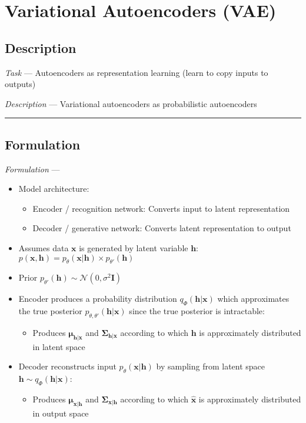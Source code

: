 \section{Variational Autoencoders (VAE)}
\subsection*{Description}
\emph{Task} --- Autoencoders as representation learning (learn to copy inputs to outputs)

\emph{Description} --- Variational autoencoders as probabilistic autoencoders

{\color{black}\hrule height 0.001mm}

\subsection*{Formulation}
\emph{Formulation} --- 
\begin{itemize}
    \item Model architecture: 
    \begin{itemize}
        \item Encoder / recognition network: Converts input to latent representation
        \item Decoder / generative network: Converts latent representation to output
    \end{itemize}
    \item Assumes data $\boldsymbol{x}$ is generated by latent variable $\boldsymbol{h}$: $p(\boldsymbol{x}, \boldsymbol{h}) = p_\theta(\boldsymbol{x} | \boldsymbol{h}) \times p_{\theta'}(\boldsymbol{h})$
    \item Prior $p_{\theta'}(\boldsymbol{h}) \sim \mathcal{N}(0,\sigma^2 \boldsymbol{I})$
    \item Encoder produces a probability distribution $q_\Phi(\boldsymbol{h}|\boldsymbol{x})$ which approximates the true posterior $p_{\theta, \theta'}(\boldsymbol{h}|\boldsymbol{x})$ since the true posterior is intractable:
    \begin{itemize}
        \item Produces $\boldsymbol{\mu}_{\boldsymbol{h|x}}$ and $\boldsymbol{\Sigma}_{\boldsymbol{h|x}}$ according to which $\boldsymbol{h}$ is approximately distributed in latent space
    \end{itemize}
    \item Decoder reconstructs input $p_\theta(\boldsymbol{x} | \boldsymbol{h})$ by sampling from latent space $\boldsymbol{h} \sim q_\Phi(\boldsymbol{h}|\boldsymbol{x})$:
    \begin{itemize}
        \item Produces $\boldsymbol{\mu}_{\boldsymbol{x|h}}$ and $\boldsymbol{\Sigma}_{\boldsymbol{x|h}}$ according to which $\boldsymbol{\hat{x}}$ is approximately distributed in output space
    \end{itemize}
\end{itemize}

